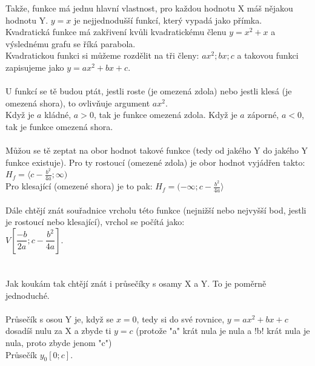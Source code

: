 \documentclass{article}
\begin{document}
\fontsize{12pt}{12pt}\selectfont\noindent
Takže, funkce má jednu hlavní vlastnost, pro každou hodnotu X máš nějakou hodnotu Y. $y = x$ je nejjednodušší funkcí, který vypadá jako přímka.\\
Kvadratická funkce má zakřivení kvůli kvadratickému členu $y = x^2 + x$ a výslednému grafu se říká parabola.\\
Kvadratickou funkci si můžeme rozdělit na tři členy: $ax^2; bx; c$ a takovou funkci zapisujeme jako $y = ax^2 + bx + c$.\\
\vspace*{1pt}\\
U funkcí se tě budou ptát, jestli roste (je omezená zdola) nebo jestli klesá (je omezená shora), to ovlivňuje argument $ax^2$.\\
Když je $a$ kládné, $a > 0$, tak je funkce omezená zdola. Když je $a$ záporné, $a < 0$, tak je funkce omezená shora.\\
\vspace*{1pt}\\
Můžou se tě zeptat na obor hodnot takové funkce (tedy od jakého Y do jakého Y funkce existuje).
Pro ty rostoucí (omezené zdola) je obor hodnot vyjádřen takto: $H_f = \langle c - \frac{b^2}{4a} ; \infty )$\\
Pro klesající (omezené shora) je to pak: $H_f = ( - \infty ; c - \frac{b^2}{4a} \rangle$\\
\vspace*{1pt}\\
Dále chtějí znát souřadnice vrcholu této funkce (nejnižší nebo nejvyšší bod, jestli je rostoucí nebo klesající), vrchol se počítá jako:\\
$V[\dfrac{-b}{2a} ; c - \dfrac{b^2}{4a}]$.\\
\vspace*{1pt}\\
\vspace*{1pt}\\
Jak koukám tak chtějí znát i průsečíky s osamy X a Y. To je poměrně jednoduché.\\
\vspace*{1pt}\\
Průsečík s osou Y je, když se $x = 0$, tedy si do své rovnice, $y = ax^2 + bx + c$ dosadíš nulu za X a zbyde ti $y = c$ (protože "a" krát nula je nula a !b! krát nula je nula, proto zbyde jenom "c")\\
Průsečík $y_0[0 ; c]$.\\
\vspace*{1pt}\\
\end{document}

